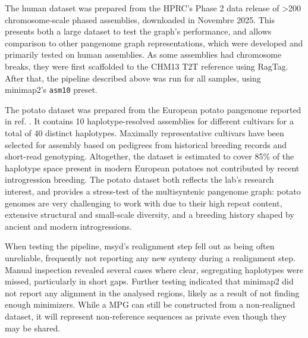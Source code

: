 The human dataset was prepared from the HPRC's Phase 2 data release of >200 chromosome-scale phased assemblies, downloaded in Novembre 2025\cite{hprc2}.
This presents both a large dataset to test the graph's performance, and allows comparison to other pangenome graph representations, which were developed and primarily tested on human assemblies. 
As some assemblies had chromosome breaks, they were first scaffolded to the CHM13 T2T reference using RagTag\cite{ragtag}.
After that, the pipeline described above was run for all samples, using minimap2's \texttt{asm10} preset.

The potato dataset was prepared from the European potato pangenome reported in ref. \cite{sun25}.
It contains 10 haplotype-resolved assemblies for different cultivars for a total of 40 distinct haplotypes.
Maximally representative cultivars have been selected for assembly based on pedigrees from historical breeding records and short-read genotyping.
Altogether, the dataset is estimated to cover 85\% of the haplotype space present in modern European potatoes not contributed by recent introgression breeding.
The potato dataset both reflects the lab's research interest, and provides a stress-test of the multisyntenic pangenome graph:
potato genomes are very challenging to work with due to their high repeat content, extensive structural and small-scale diversity, and a breeding history shaped by ancient and modern introgressions.

When testing the pipeline, msyd's realignment step fell out as being often unreliable, frequently not reporting any new synteny during a realignment step.
Manual inspection revealed several cases where clear, segregating haplotypes were missed, particularly in short gaps.
Further testing indicated that minimap2 did not report any alignment in the analysed regions, likely as a result of not finding enough minimizers.
While a MPG can still be constructed from a non-realigned dataset, it will represent non-reference sequences as private even though they may be shared.
